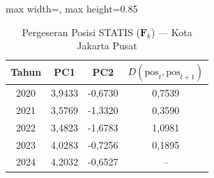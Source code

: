 \begin{table}[H]
\centering
\caption{Pergeseran Posisi STATIS ($\mathbf{F}_k$) --- Kota Jakarta Pusat} \label{tab:app2jarak_statis_skor_kota_jakarta_pusat}
\begin{adjustbox}{max width=\textwidth, max height=0.85\textheight}
\begin{tabular}{|c|c|c|c|}
\hline
\textbf{Tahun} & \textbf{PC1} & \textbf{PC2} & \textbf{$D(\text{pos}_t, \text{pos}_{t+1})$} \\
\hline
2020 & 3,9433 & -0,6730 & 0,7539 \\
2021 & 3,5769 & -1,3320 & 0,3590 \\
2022 & 3,4823 & -1,6783 & 1,0981 \\
2023 & 4,0283 & -0,7256 & 0,1895 \\
2024 & 4,2032 & -0,6527 & -- \\
\hline
\end{tabular}
\end{adjustbox}
\end{table}